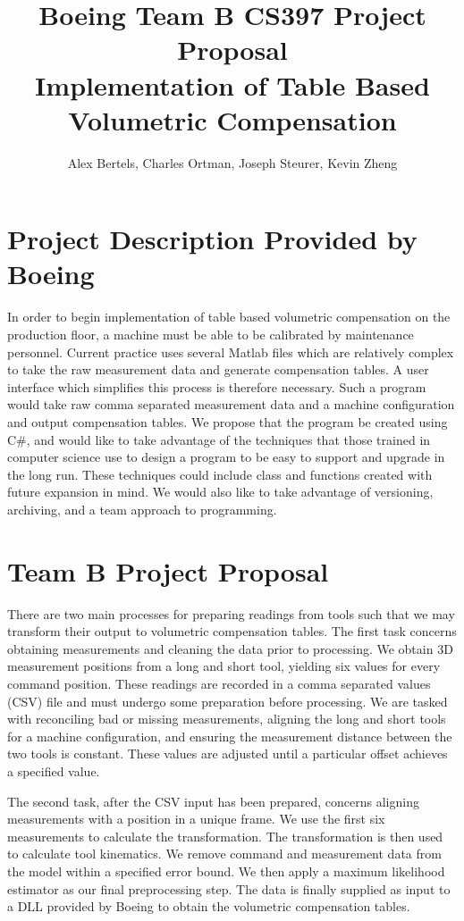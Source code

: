 \documentclass[pdftex,10pt,a4paper]{article}
\title{Boeing Team B CS397 Project Proposal \\
{\small Implementation of Table Based Volumetric Compensation} }
\author{Alex Bertels, Charles Ortman, Joseph Steurer, Kevin Zheng}
\date{}
\begin{document}
\maketitle
\vspace{-40pt}

\section*{Project Description Provided by Boeing} 
In order to begin implementation of table based volumetric compensation on the production floor, a machine must be able to be calibrated by maintenance personnel. Current practice uses several Matlab files which are relatively complex to take the raw measurement data and generate compensation tables. A user interface which simplifies this process is therefore necessary. Such a program would take raw comma separated measurement data and a machine configuration and output compensation tables.  We propose that the program be created using C\#, and would like to take advantage of the techniques that those trained in computer science use to design a program to be easy to support and upgrade in the long run. These techniques could include class and functions created with future expansion in mind. We would also like to take advantage of versioning, archiving, and a team approach to programming. 

\section*{Team B Project Proposal}
There are two main processes for preparing readings from tools such that we may transform their output to volumetric compensation tables. The first task concerns obtaining measurements and cleaning the data prior to processing. We obtain 3D measurement positions from a long and short tool, yielding six values for every command position. These readings are recorded in a comma separated values (CSV) file and must undergo some preparation before processing. We are tasked with reconciling bad or missing measurements, aligning the long and short tools for a machine configuration, and ensuring the measurement distance between the two tools is constant. These values are adjusted until a particular offset achieves a specified value. 

The second task, after the CSV input has been prepared, concerns aligning measurements with a position in a unique frame. We use the first six measurements to calculate the transformation. The transformation is then used to calculate tool kinematics. We remove command and measurement data from the model within a specified error bound. We then apply a maximum likelihood estimator as our final preprocessing step. The data is finally supplied as input to a DLL provided by Boeing to obtain the volumetric compensation tables. 
\end{document}
